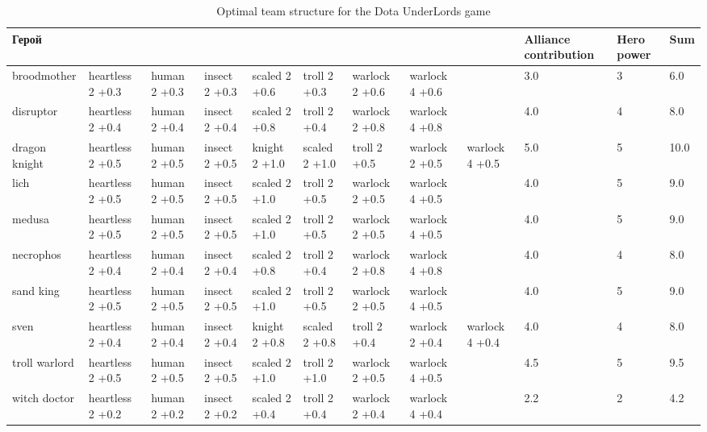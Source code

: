 \documentclass{article}
\begin{document}
\begin{table}
\resizebox{16cm}{!} {
\begin{tabular}{l| *{8}{p{1.6cm}} | *{3}{ p{1cm}} }
{Герой} &                   &               &                &                &                &                  &                  &                  &  Alliance contribution &  Hero power &   Sum \\
\midrule
broodmother   &  heartless 2 +0.3  &  human 2 +0.3  &  insect 2 +0.3  &  scaled 2 +0.6  &   troll 2 +0.3  &  warlock  2 +0.6  &  warlock  4 +0.6  &                   &                  3.0 &           3 &   6.0 \\
disruptor     &  heartless 2 +0.4  &  human 2 +0.4  &  insect 2 +0.4  &  scaled 2 +0.8  &   troll 2 +0.4  &  warlock  2 +0.8  &  warlock  4 +0.8  &                   &                  4.0 &           4 &   8.0 \\
dragon knight &  heartless 2 +0.5  &  human 2 +0.5  &  insect 2 +0.5  &  knight 2 +1.0  &  scaled 2 +1.0  &     troll 2 +0.5  &  warlock  2 +0.5  &  warlock  4 +0.5  &                  5.0 &           5 &  10.0 \\
lich          &  heartless 2 +0.5  &  human 2 +0.5  &  insect 2 +0.5  &  scaled 2 +1.0  &   troll 2 +0.5  &  warlock  2 +0.5  &  warlock  4 +0.5  &                   &                  4.0 &           5 &   9.0 \\
medusa        &  heartless 2 +0.5  &  human 2 +0.5  &  insect 2 +0.5  &  scaled 2 +1.0  &   troll 2 +0.5  &  warlock  2 +0.5  &  warlock  4 +0.5  &                   &                  4.0 &           5 &   9.0 \\
necrophos     &  heartless 2 +0.4  &  human 2 +0.4  &  insect 2 +0.4  &  scaled 2 +0.8  &   troll 2 +0.4  &  warlock  2 +0.8  &  warlock  4 +0.8  &                   &                  4.0 &           4 &   8.0 \\
sand king     &  heartless 2 +0.5  &  human 2 +0.5  &  insect 2 +0.5  &  scaled 2 +1.0  &   troll 2 +0.5  &  warlock  2 +0.5  &  warlock  4 +0.5  &                   &                  4.0 &           5 &   9.0 \\
sven          &  heartless 2 +0.4  &  human 2 +0.4  &  insect 2 +0.4  &  knight 2 +0.8  &  scaled 2 +0.8  &     troll 2 +0.4  &  warlock  2 +0.4  &  warlock  4 +0.4  &                  4.0 &           4 &   8.0 \\
troll warlord &  heartless 2 +0.5  &  human 2 +0.5  &  insect 2 +0.5  &  scaled 2 +1.0  &   troll 2 +1.0  &  warlock  2 +0.5  &  warlock  4 +0.5  &                   &                  4.5 &           5 &   9.5 \\
witch doctor  &  heartless 2 +0.2  &  human 2 +0.2  &  insect 2 +0.2  &  scaled 2 +0.4  &   troll 2 +0.4  &  warlock  2 +0.4  &  warlock  4 +0.4  &                   &                  2.2 &           2 &   4.2 \\
\bottomrule
\end{tabular}
}
\caption{Optimal team structure for the Dota UnderLords game }
\label{table:solution}
\end{table}
\end{document}
